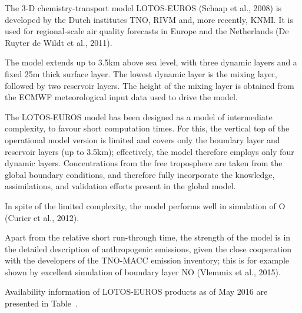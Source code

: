 \documentclass[9pt]{article}
\begin{document}
\noindent{}The 3-D chemistry-transport model LOTOS-EUROS (Schaap et al., 2008) is developed by the Dutch institutes TNO, RIVM and, more recently, KNMI.
It is used for regional-scale air quality forecasts in Europe and the Netherlands (De Ruyter de Wildt et al., 2011).%

The model extends up to 3.5km above sea level, with three dynamic layers and a ﬁxed 25m thick surface layer. 
The lowest dynamic layer is the mixing layer, followed by two reservoir layers. 
The height of the mixing layer is obtained from the ECMWF meteorological input data used to drive the model.%

The LOTOS-EUROS model has been designed as a model of intermediate complexity, to favour short computation times. 
For this, the vertical top of the operational model version is limited and covers only the boundary layer and reservoir layers (up to 3.5km); effectively, the model therefore employs only four dynamic layers. 
Concentrations from the free troposphere are taken from the global boundary conditions, and therefore fully incorporate the knowledge, assimilations, and validation efforts present in the global model.%

In spite of the limited complexity, the model performs well in simulation of O (Curier et al., 2012).%

Apart from the relative short run-through time, the strength of the model is in the detailed description of anthropogenic emissions, given the close cooperation with the developers of the TNO-MACC emission inventory; this is for example shown by excellent simulation of boundary layer NO (Vlemmix et al., 2015).%

Availability information of LOTOS-EUROS products as of May 2016 are presented in Table~.%
\end{document}
